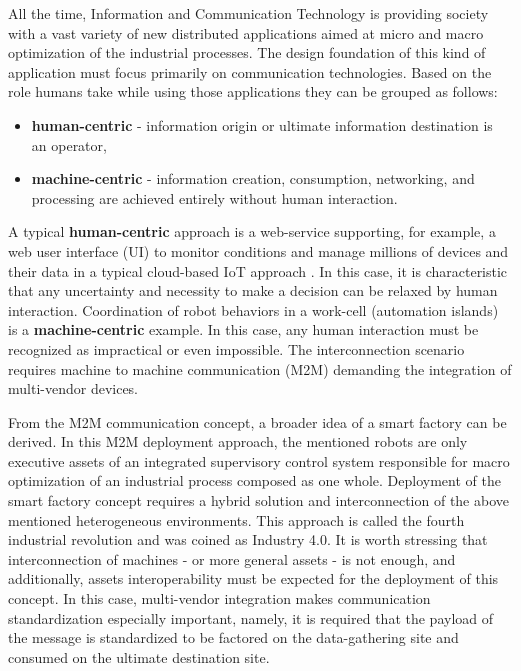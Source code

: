 \documentclass[runningheads]{llncs}
\begin{document}
All the time, Information and Communication Technology is providing society with a vast variety of new distributed applications aimed at micro and macro optimization of the industrial processes. The design foundation of this kind of application must focus primarily on communication technologies. Based on the role humans take while using those applications they can be grouped as follows:

\begin{itemize}
      \item \textbf{human-centric} - information origin or ultimate information destination is an operator,
      \item \textbf{machine-centric} - information creation, consumption, networking, and processing are achieved entirely without human interaction.
\end{itemize}

A typical \textbf{human-centric} approach is a web-service supporting, for example, a web user interface (UI) to monitor conditions and manage millions of devices and their data in a typical cloud-based IoT approach \cite{RefWorks:doc:5d87d02be4b0e88bdacab9a7, RefWorks:doc:5d87d1c9e4b0bc72a68d7b46, RefWorks:doc:5d9216c9e4b03ba5e075a855, 10.1007/978-3-030-50426-7_22}. In this case, it is characteristic that any uncertainty and necessity to make a decision can be relaxed by human interaction. Coordination of robot behaviors in a work-cell (automation islands) is a \textbf{machine-centric} example. In this case, any human interaction must be recognized as impractical or even impossible. The interconnection scenario requires machine to machine communication (M2M) \cite{RefWorks:doc:5d6cdbbbe4b082ad50f3a83e, mpostol2020, RefWorks:doc:5d8f6d9ee4b058d660094a94, RefWorks:doc:5d868e46e4b030b4e0569e60, RefWorks:doc:5d8f7275e4b0bc72a68f4dcb} demanding the integration of multi-vendor devices.

From the M2M communication concept, a broader idea of a smart factory can be derived. In this M2M  deployment approach, the mentioned robots are only executive assets of an integrated supervisory control system responsible for macro optimization of an industrial process composed as one whole. Deployment of the smart factory concept requires a hybrid solution and interconnection of the above mentioned heterogeneous environments. This approach is called the fourth industrial revolution and was coined as Industry 4.0. It is worth stressing that interconnection of machines - or more general assets - is not enough, and additionally, assets interoperability must be expected for the deployment of this concept. In this case, multi-vendor integration makes communication standardization especially important, namely, it is required that the payload of the message is standardized to be factored on the data-gathering site and consumed on the ultimate destination site.
\end{document}
